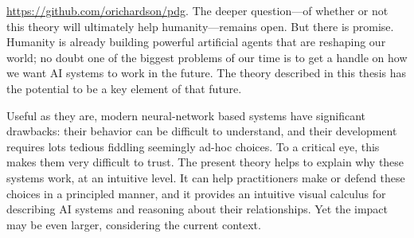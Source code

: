     {\small\url{https://github.com/orichardson/pdg}}.
%
%
%
%
%
%
The deeper question---of whether or not this theory will ultimately help humanity---remains open.
But there is promise. Humanity is already building powerful artificial agents that are reshaping our world; no doubt one of the biggest problems of our time is to get a handle on how we want AI systems to work in the future.  
The theory described in this thesis has the potential to be a key element of that future.

Useful as they are, modern neural-network based systems have significant drawbacks:
their behavior can be difficult to understand, 
and their development requires lots tedious fiddling seemingly ad-hoc choices.
To a critical eye, this makes them very difficult to trust.
The present theory helps to explain why these systems work, at an intuitive level.
It can help practitioners make or defend these choices in a principled manner, and it provides an intuitive visual calculus for describing AI systems and reasoning about their relationships. 
Yet the impact may be even larger, considering the current context. 

